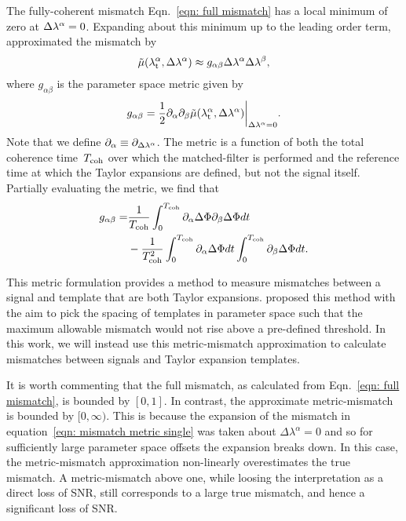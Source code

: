 \documentclass[../full_thesis/full_thesis.tex]{subfiles}
\begin{document}
The fully-coherent mismatch Eqn.~\eqref{eqn: full mismatch} has a local
minimum of zero at $\Delta\lambda^{\alpha}=0$. Expanding about this minimum up to the
leading order term, \citet{Brady1998} approximated the mismatch by
\begin{equation}
\tilde{\mu}({\lambda}_\textrm{t}^{\alpha}, \Delta\lambda^{\alpha}) \approx
g_{\alpha\beta}\Delta\lambda^{\alpha}\Delta\lambda^{\beta},
\label{eqn: mismatch metric single}
\end{equation}
where $g_{\alpha\beta}$ is the parameter space metric given by
\begin{equation}
    g_{\alpha\beta} =
    \frac{1}{2}\partial_{\alpha}\partial_{\beta}
    \tilde{\mu}({\lambda}_\textrm{t}^{\alpha}, \Delta\lambda^{\alpha}) \biggr\rvert_{\Delta\lambda^{\alpha}=0}.
\end{equation}
Note that we define $\partial_{\alpha} \equiv \partial_{\Delta\lambda^{\alpha}}$.
The metric is a function  of both the total coherence time~$T_{\mathrm{coh}}$ over which the
matched-filter is performed and the reference time at which the Taylor expansions
are defined, but not the signal itself. Partially evaluating the metric, we find that
\begin{align}
\begin{split}
    g_{\alpha \beta} = &
    \frac{1}{T_{\mathrm{coh}}}\int_{0}^{T_{\mathrm{coh}}}\partial_{\alpha}\Delta\Phi
                               \partial_{\beta}\Delta\Phi dt \\
   & -\frac{1}{T_{\mathrm{coh}}^{2}}\int_{0}^{T_{\mathrm{coh}}} \partial_{\alpha}\Delta\Phi dt
                 \int_{0}^{T_{\mathrm{coh}}} \partial_{\beta}\Delta\Phi dt.
\end{split}
\label{eqn: fully-coherent metric simple}
\end{align}

This metric formulation provides a method to measure mismatches between a
signal and template that are both Taylor expansions. \citet{Brady1998} proposed
this method with the aim to pick the spacing of templates in parameter space
such that the maximum allowable mismatch would not rise above a pre-defined
threshold. In this work, we will instead use this metric-mismatch approximation to
calculate mismatches between signals and Taylor expansion templates.

It is worth commenting that the full mismatch, as calculated from
Eqn.~\eqref{eqn: full mismatch}, is bounded by $[0, 1]$. In contrast, the
approximate metric-mismatch is bounded by $[0, \infty)$. This is because the expansion
of the mismatch in equation~\eqref{eqn: mismatch metric single} was taken
about $\Delta\lambda^{\alpha}=0$ and so for sufficiently large parameter
space offsets the expansion breaks down. In this case, the metric-mismatch
approximation non-linearly overestimates the true mismatch. A metric-mismatch above one, while loosing the interpretation as a direct loss of SNR, still
corresponds to a large true mismatch, and hence a significant loss of SNR.
\end{document}
